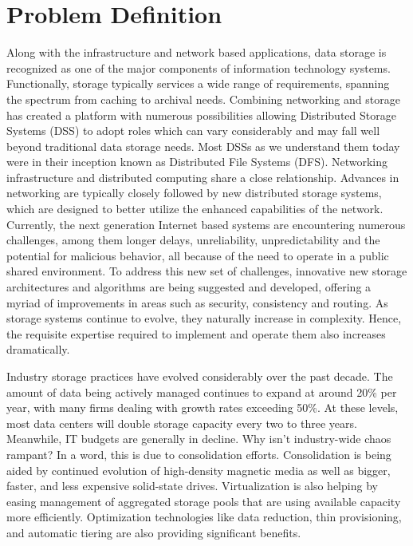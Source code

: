 \documentclass[11pt]{article}
\begin{document}
\section{Problem Definition}
Along with the infrastructure and network based applications, data
storage is recognized as one of the major components of information
technology systems.  Functionally, storage typically services a wide
range of requirements, spanning the spectrum from caching to archival
needs. Combining networking and storage has created a platform with
numerous possibilities allowing Distributed Storage Systems (DSS) to
adopt roles which can vary considerably and may fall well beyond
traditional data storage needs. Most DSSs as we understand them today
were in their inception known as Distributed File Systems (DFS).
Networking infrastructure and distributed computing share a close
relationship. Advances in networking are typically closely followed by
new distributed storage systems, which are designed to better utilize
the enhanced capabilities of the network. Currently, the next
generation Internet based systems are encountering numerous
challenges, among them longer delays, unreliability, unpredictability
and the potential for malicious behavior, all because of the need to
operate in a public shared environment. To address this new set of
challenges, innovative new storage architectures and algorithms are
being suggested and developed, offering a myriad of improvements in
areas such as security, consistency and routing. As storage systems
continue to evolve, they naturally increase in complexity. Hence, the
requisite expertise required to implement and operate them also
increases dramatically.

Industry storage practices have evolved considerably over the past
decade. The amount of data being actively managed continues to expand
at around 20\% per year, with many firms dealing with growth rates
exceeding 50\%. At these levels, most data centers will double storage
capacity every two to three years. Meanwhile, IT budgets are generally
in decline. Why isn't industry-wide chaos rampant? In a word, this is
due to consolidation efforts. Consolidation is being aided by
continued evolution of high-density magnetic media as well as bigger,
faster, and less expensive solid-state drives. Virtualization is also
helping by easing management of aggregated storage pools that are
using available capacity more efficiently. Optimization technologies
like data reduction, thin provisioning, and automatic tiering are also
providing significant benefits.
\end{document}
